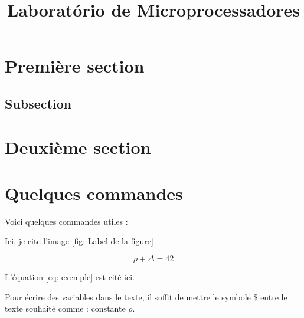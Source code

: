 \documentclass{poliReport}
\title{Laboratório de Microprocessadores} %
\begin{document}




        
\fairemarges %
\fairepagedegarde %
\tabledematieres %



\chapter{Première section} 

\lipsum[3-4]%

\section{Subsection}

\lipsum[3-4] %
\lipsum[3-4]
\chapter{Deuxième section}

\lipsum[3-5] %


\chapter{Quelques commandes}

Voici quelques commandes utiles :


Ici, je cite l'image \ref{fig: Label de la figure}



\begin{equation} \label{eq: exemple}
\rho + \Delta = 42
\end{equation}

L'équation \ref{eq: exemple} est cité ici. 


Pour écrire des variables dans le texte, il suffit de mettre le symbole \$ entre le texte souhaité comme : constante $\rho$. 
\end{document}
